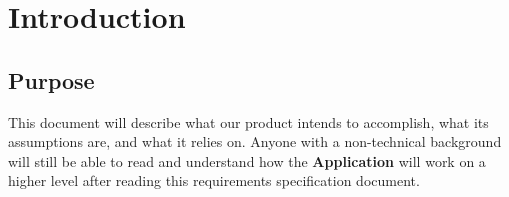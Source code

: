 \documentclass[english]{article}
\begin{document}
\vspace*{\fill} 
\vspace*{\fill} 

\newpage

\tableofcontents

\newpage

\setcounter{page}{1}
\raggedright

\section{Introduction}
\label{sec:introduction}

\subsection{Purpose}
\label{sub:purpose}
This document will describe what our product intends to accomplish, what its assumptions are, and what it relies on. Anyone with a non-technical background will still be able to read and understand how the \textbf{Application} will work on a higher level after reading this requirements specification document.
\end{document}
